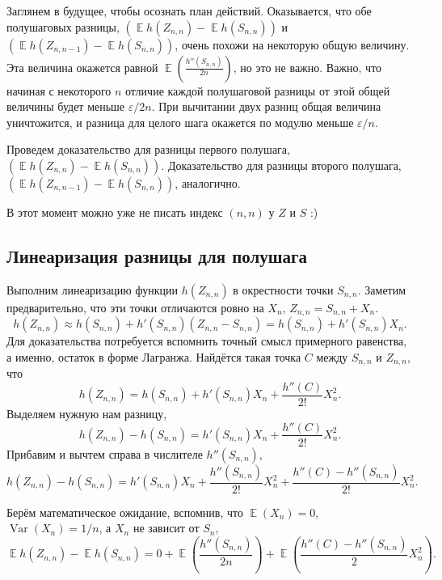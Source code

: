 \documentclass[
  letterpaper,
  DIV=11,
  numbers=noendperiod]{scrartcl}
\begin{document}
Заглянем в будущее, чтобы осознать план действий. Оказывается, что обе
полушаговых разницы,
\(\left(\mathop{\mathrm{\mathbb{E}}}h(Z_{n,n}) - \mathop{\mathrm{\mathbb{E}}}h(S_{n,n}) \right)\)
и
\(\left(\mathop{\mathrm{\mathbb{E}}}h(Z_{n,n-1}) - \mathop{\mathrm{\mathbb{E}}}h(S_{n,n}) \right)\),
очень похожи на некоторую общую величину. Эта величина окажется равной
\(\mathop{\mathrm{\mathbb{E}}}\left(\frac{h''(S_{n,n})}{2n}\right)\), но
это не важно. Важно, что начиная с некоторого \(n\) отличие каждой
полушаговой разницы от этой общей величины будет меньше
\(\varepsilon/2n\). При вычитании двух разниц общая величина
уничтожится, и разница для целого шага окажется по модулю меньше
\(\varepsilon/n\).

Проведем доказательство для разницы первого полушага,
\(\left(\mathop{\mathrm{\mathbb{E}}}h(Z_{n,n}) - \mathop{\mathrm{\mathbb{E}}}h(S_{n,n}) \right)\).
Доказательство для разницы второго полушага,
\(\left(\mathop{\mathrm{\mathbb{E}}}h(Z_{n,n-1}) - \mathop{\mathrm{\mathbb{E}}}h(S_{n,n}) \right)\),
аналогично.

В этот момент можно уже не писать индекс \((n,n)\) у \(Z\) и \(S\) :)

\subsection{Линеаризация разницы для
полушага}\label{ux43bux438ux43dux435ux430ux440ux438ux437ux430ux446ux438ux44f-ux440ux430ux437ux43dux438ux446ux44b-ux434ux43bux44f-ux43fux43eux43bux443ux448ux430ux433ux430}

Выполним линеаризацию функции \(h(Z_{n,n})\) в окрестности точки
\(S_{n,n}\). Заметим предварительно, что эти точки отличаются ровно на
\(X_n\), \(Z_{n,n} = S_{n,n} + X_n\). \[
h(Z_{n,n}) \approx h(S_{n,n}) + h'(S_{n,n})(Z_{n,n} - S_{n,n}) = h(S_{n,n}) + h'(S_{n,n}) X_n.
\] Для доказательства потребуется вспомнить точный смысл примерного
равенства, а именно, остаток в форме Лагранжа. Найдётся такая точка
\(C\) между \(S_{n,n}\) и \(Z_{n,n}\), что \[
h(Z_{n,n}) = h(S_{n,n}) + h'(S_{n,n})X_n + \frac{h''(C)}{2!}X_n^2.
\] Выделяем нужную нам разницу, \[
h(Z_{n,n}) - h(S_{n,n}) = h'(S_{n,n})X_n + \frac{h''(C)}{2!}X_n^2.
\] Прибавим и вычтем справа в числителе \(h''(S_{n,n})\), \[
h(Z_{n,n}) - h(S_{n,n}) = h'(S_{n,n})X_n + \frac{h''(S_{n,n})}{2!}X_n^2 + \frac{h''(C) - h''(S_{n,n})}{2!}X_n^2.
\]

Берём математическое ожидание, вспомнив, что
\(\mathop{\mathrm{\mathbb{E}}}(X_n) =0\),
\(\mathop{\mathrm{Var}}(X_n)= 1/n\), а \(X_n\) не зависит от \(S_n\), \[
\mathop{\mathrm{\mathbb{E}}}h(Z_{n,n}) - \mathop{\mathrm{\mathbb{E}}}h(S_{n,n}) = 0 + \mathop{\mathrm{\mathbb{E}}}\left(\frac{h''(S_{n,n})}{2n}\right) + \mathop{\mathrm{\mathbb{E}}}\left(\frac{h''(C) - h''(S_{n,n})}{2}X_n^2\right).
\]
\end{document}
